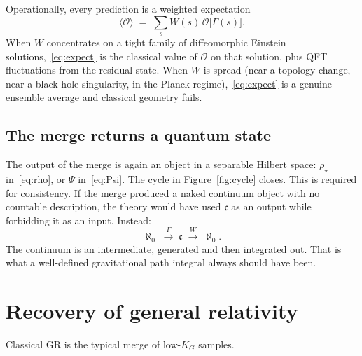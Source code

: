 \documentclass[11pt,a4paper]{article}
\theoremstyle{plain}
\theoremstyle{definition}
\theoremstyle{remark}
\newcommand{\alef}{\aleph_{0}}
\newcommand{\cont}{\mathfrak{c}}
\newcommand{\KG}{K_{G}}
\begin{document}
Operationally, every prediction is a weighted expectation
\begin{equation}
  \langle\mathcal{O}\rangle \;=\; \sum_{s} W(s)\, \mathcal{O}\bigl[\Gamma(s)\bigr].
  \label{eq:expect}
\end{equation}
When $W$ concentrates on a tight family of diffeomorphic Einstein solutions,~\eqref{eq:expect} is the classical value of $\mathcal{O}$ on that solution, plus QFT fluctuations from the residual state.
When $W$ is spread (near a topology change, near a black-hole singularity, in the Planck regime),~\eqref{eq:expect} is a genuine ensemble average and classical geometry fails.

\subsection{The merge returns a quantum state}

The output of the merge is again an object in a separable Hilbert space: $\rho_{\star}$ in~\eqref{eq:rho}, or $\Psi$ in~\eqref{eq:Psi}.
The cycle in Figure~\ref{fig:cycle} closes.
This is required for consistency.
If the merge produced a naked continuum object with no countable description, the theory would have used $\cont$ as an output while forbidding it as an input.
Instead:
\begin{equation}
  \alef \;\xrightarrow{\ \Gamma\ }\; \cont \;\xrightarrow{\ W\ }\; \alef.
\end{equation}
The continuum is an intermediate, generated and then integrated out.
That is what a well-defined gravitational path integral always should have been.

\section{Recovery of general relativity}
\label{sec:gr}

Classical GR is the typical merge of low-$\KG$ samples.
\end{document}
